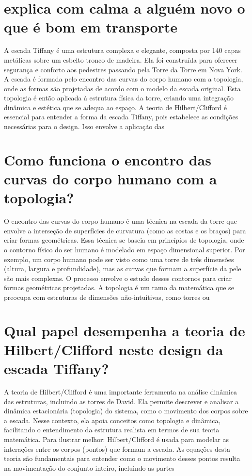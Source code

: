 \documentclass[11pt,a4paper]{article}
\begin{document}
\section{explica com calma a alguém novo o que é bom em transporte}
A escada Tiffany é uma estrutura complexa e elegante, composta por 140 capas metálicas sobre um esbelto tronco de madeira. Ela foi construída para oferecer segurança e conforto aos pedestres passando pela Torre da Torre em Nova York. A escada é formada pelo encontro das curvas do corpo humano com a topologia, onde as formas são projetadas de acordo com o modelo da escada original. Esta topologia é então aplicada à estrutura física da torre, criando uma integração dinâmica e estética que se adequa ao espaço. A teoria de Hilbert/Clifford é essencial para entender a forma da escada Tiffany, pois estabelece as condições necessárias para o design. Isso envolve a aplicação das

\section{Como funciona o encontro das curvas do corpo humano com a topologia?}
O encontro das curvas do corpo humano é uma técnica na escada da torre que envolve a interseção de superfícies de curvatura (como as costas e os braços) para criar formas geométricas. Essa técnica se baseia em princípios de topologia, onde o contorno físico do ser humano é modelado em espaço dimensional superior. Por exemplo, um corpo humano pode ser visto como uma torre de três dimensões (altura, largura e profundidade), mas as curvas que formam a superfície da pele são mais complexas. O processo envolve o estudo desses contornos para criar formas geométricas projetadas. A topologia é um ramo da matemática que se preocupa com estruturas de dimensões não-intuitivas, como torres ou

\section{Qual papel desempenha a teoria de Hilbert/Clifford neste design da escada Tiffany?}
A teoria de Hilbert/Clifford é uma importante ferramenta na análise dinâmica das estruturas, incluindo as torres de David. Ela permite descrever e analisar a dinâmica estacionária (topologia) do sistema, como o movimento dos corpos sobre a escada. Nesse contexto, ela apoia conceitos como topologia e dinâmica, facilitando o entendimento da estrutura realista em termos de sua teoria matemática. Para ilustrar melhor: Hilbert/Clifford é usada para modelar as interações entre os corpos (pontos) que formam a escada. As equações desta teoria são fundamentais para entender como o movimento desses pontos resulta na movimentação do conjunto inteiro, incluindo as partes
\end{document}
